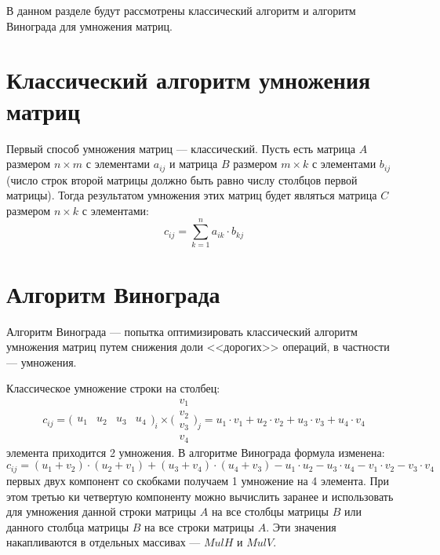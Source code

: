 \documentclass{bmstu}
\begin{document}
В данном разделе будут рассмотрены классический алгоритм и алгоритм Винограда для умножения матриц.

\section{Классический алгоритм умножения матриц}
Первый способ умножения матриц --- классический. Пусть есть матрица $A$ размером $n \times m$ с элементами $a_{ij}$ и матрица $B$ размером $m \times k$ с элементами $b_{ij}$ (число строк второй матрицы должно быть равно числу столбцов первой матрицы). Тогда результатом умножения этих матриц будет являться матрица $C$ размером $n \times k$ с элементами:
\begin{equation}
    \label{eq1}
    c_{ij} = \sum_{k=1}^{n}a_{ik}\cdot b_{kj}
\end{equation}


\section{Алгоритм Винограда}
Алгоритм Винограда --- попытка оптимизировать классический алгоритм умножения матриц путем снижения доли <<дорогих>> операций, в частности --- умножения.
\par Классическое умножение строки на столбец:
\begin{equation}
    \label{eq2}
    c_{ij} =
\big(\begin{smallmatrix}
  u_{1} & u_{2} & u_{3} & u_{4}
\end{smallmatrix}\big)_{i}
\times
\big(\begin{smallmatrix}
  v_{1}\\v_{2}\\v_{3}\\v_{4}
\end{smallmatrix}\big)_{j} = u_{1}\cdot v_{1} + u_{2}\cdot v_{2} + u_{3}\cdot v_{3} + u_{4}\cdot v_{4}
\end{equation}
 элемента приходится 2 умножения.
В алгоритме Винограда формула изменена:
\begin{equation}
    \label{eq3}
    c_{ij} = (u_{1} + v_{2}) \cdot (u_{2} + v_{1}) + (u_{3} + v_{4}) \cdot (u_{4} + v_{3}) - u_{1} \cdot u_{2} - u_{3} \cdot u_{4} - v_{1} \cdot v_{2} - v_{3} \cdot v_{4}
\end{equation}
 первых двух компонент со скобками получаем 1 умножение на 4 элемента. При этом третью ки четвертую компоненту можно вычислить заранее и использовать для умножения данной строки матрицы $A$ на все столбцы матрицы $B$ или данного столбца матрицы $B$ на все строки матрицы $A$.
Эти значения накапливаются в отдельных массивах --- $MulH$ и $MulV$.
\end{document}

